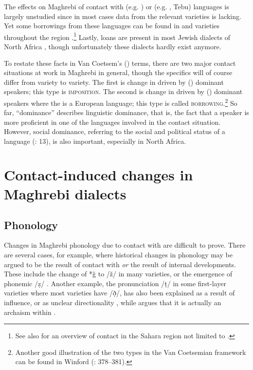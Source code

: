 \documentclass[output=paper]{langsci/langscibook}
\begin{document}
  The effects on Maghrebi  of contact with  (e.g. ) or  (e.g. , Tebu) languages is largely unstudied since in most cases data from the relevant  varieties is lacking. Yet some borrowings from these languages can be found in  and  varieties throughout the region \citep{Souag2013lexical}.\footnote{See also \citet{Souag2016sahara} for an overview of contact in the Sahara region not limited to .} Lastly,  loans are present in most Jewish  dialects of North Africa \citep{Yoda2013}, though unfortunately these dialects hardly exist anymore.


  To restate these facts in Van Coetsem’s (\citeyear{VanCoetsem1988,VanCoetsem2000}) terms, there are two major contact situations at work in Maghrebi  in general, though the specifics will of course differ from variety to variety. The first is change in  driven by  () dominant speakers; this  type is \textsc{imposition}. The second is change in  driven by  () dominant speakers where the  is a European  language; this  type is called \textsc{borrowing}.\footnote{Another good illustration of the two  types in the Van Coetsemian framework can be found in Winford (\citeyear{Winford2005}: 378–381).} So far, ``dominance'' describes linguistic dominance, that is, the fact that a speaker is more proficient in one of the languages involved in the contact situation. However, social dominance, referring to the social and political status of a language (\citealt{VanCoetsem1988}: 13), is also important, especially in North Africa.

\section{ Contact-induced changes in Maghrebi dialects}

\subsection{ Phonology}

Changes in Maghrebi  phonology due to contact with  are difficult to prove. There are several cases, for example, where historical changes in  phonology may be argued to be the result of contact with  \textit{or} the result of internal developments. These include the change of *ǧ to /ž/ in many varieties, or the emergence of phonemic /ẓ/ \citep{Souag2016sahara}. Another example, the pronunciation /ṭ/ in some first-layer varieties where most  varieties have /ð̣/, has also been explained as a result of  influence, or as unclear directionality \citep[187]{Kossmann2013book}, while \citet{Al-Jallad2015Maghreb} argues that it is actually an archaism within .
\end{document}
